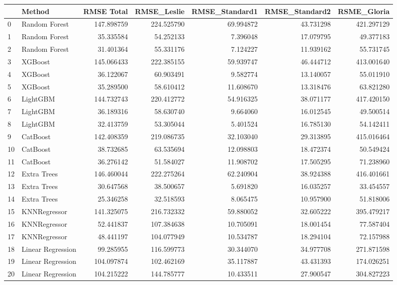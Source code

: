 \begin{tabular}{llrrrrr}
\toprule
{} &             Method &  RMSE Total &  RMSE\_Leslie &  RMSE\_Standard1 &  RMSE\_Standard2 &  RSME\_Gloria \\
\midrule
0  &      Random Forest &  147.898759 &   224.525790 &       69.994872 &       43.731298 &   421.297129 \\
1  &      Random Forest &   35.335584 &    54.252133 &        7.396048 &       17.079795 &    49.377183 \\
2  &      Random Forest &   31.401364 &    55.331176 &        7.124227 &       11.939162 &    55.731745 \\
3  &            XGBoost &  145.066433 &   222.385155 &       59.939747 &       46.444712 &   413.001640 \\
4  &            XGBoost &   36.122067 &    60.903491 &        9.582774 &       13.140057 &    55.011910 \\
5  &            XGBoost &   35.289500 &    58.610412 &       11.608670 &       13.318476 &    63.821280 \\
6  &           LightGBM &  144.732743 &   220.412772 &       54.916325 &       38.071177 &   417.420150 \\
7  &           LightGBM &   36.189316 &    58.630740 &        9.664060 &       16.012545 &    49.500514 \\
8  &           LightGBM &   32.413759 &    53.305044 &        5.401524 &       16.785130 &    54.142411 \\
9  &           CatBoost &  142.408359 &   219.086735 &       32.103040 &       29.313895 &   415.016464 \\
10 &           CatBoost &   38.732685 &    63.535694 &       12.098803 &       18.472374 &    50.549424 \\
11 &           CatBoost &   36.276142 &    51.584027 &       11.908702 &       17.505295 &    71.238960 \\
12 &        Extra Trees &  146.460044 &   222.275264 &       62.240904 &       38.924388 &   416.401661 \\
13 &        Extra Trees &   30.647568 &    38.500657 &        5.691820 &       16.035257 &    33.454557 \\
14 &        Extra Trees &   25.346258 &    32.518593 &        8.065475 &       10.957900 &    51.818006 \\
15 &       KNNRegressor &  141.325075 &   216.732332 &       59.880052 &       32.605222 &   395.479217 \\
16 &       KNNRegressor &   52.441837 &   107.384638 &       10.705091 &       18.001454 &    77.587404 \\
17 &       KNNRegressor &   48.441197 &   104.077949 &       10.534787 &       18.294104 &    72.157988 \\
18 &  Linear Regression &   99.285955 &   116.599773 &       30.344070 &       34.977708 &   271.871598 \\
19 &  Linear Regression &  104.097874 &   102.462169 &       35.117887 &       43.431393 &   174.026251 \\
20 &  Linear Regression &  104.215222 &   144.785777 &       10.433511 &       27.900547 &   304.827223 \\
\bottomrule
\end{tabular}
